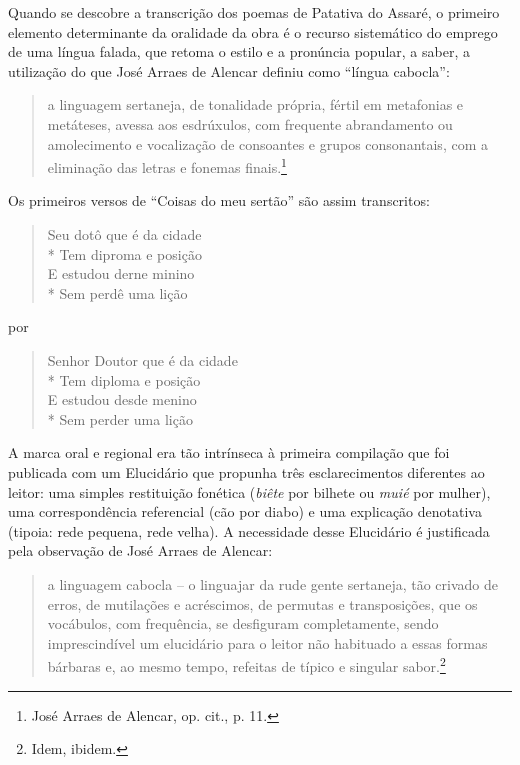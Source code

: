 Quando se descobre a transcrição dos poemas de Patativa do Assaré, o primeiro
elemento determinante da oralidade da obra é o recurso sistemático do emprego de
uma língua falada, que retoma o estilo e a pronúncia popular, a saber, a
utilização do que José Arraes de Alencar definiu como ``língua cabocla'':

\begin{quote}
a linguagem sertaneja, de tonalidade própria, fértil em metafonias e metáteses,
avessa aos esdrúxulos, com frequente abrandamento ou amolecimento e vocalização
de consoantes e grupos consonantais, com a eliminação das letras e fonemas
finais.\footnote{ José Arraes de Alencar, op. cit., p. 11.}
\end{quote}

\noindent Os primeiros versos de “Coisas do meu sertão” são assim transcritos:

\begin{verse}
Seu dotô que é da cidade \\*
Tem diproma e posição \\
E estudou derne minino \\*
Sem perdê uma lição 
\end{verse}

\noindent por

\begin{verse}
Senhor Doutor que é da cidade\\*
Tem diploma e posição\\
E estudou desde menino\\*
Sem perder uma lição
\end{verse}

A marca oral e regional era tão intrínseca à primeira compilação que foi
publicada com um Elucidário que propunha três esclarecimentos diferentes ao
leitor: uma simples restituição fonética (\textit{biête} por bilhete ou \textit{muié} por mulher),
uma correspondência referencial (cão por diabo) e uma explicação denotativa
(tipoia: rede pequena, rede velha). A necessidade desse Elucidário é
justificada pela observação de José Arraes de Alencar:

\begin{quote}
a linguagem cabocla -- o
linguajar da rude gente sertaneja, tão crivado de erros, de mutilações e
acréscimos, de permutas e transposições, que os vocábulos, com frequência, se
desfiguram completamente, sendo imprescindível um elucidário para o leitor não
habituado a essas formas bárbaras e, ao mesmo tempo, refeitas de típico e
singular sabor.\footnote{ Idem, ibidem.}
\end{quote}

